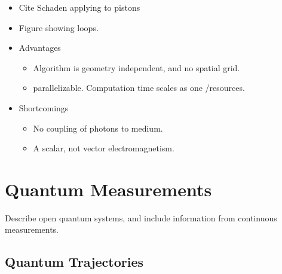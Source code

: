 \begin{itemize}
\begin{itemize}
  \begin{equation}
    F = - \int \frac{dT}{T^{1+D/2}} \dlangle e^{-\cT\langle V\rangle} - 1\drangle,
  \end{equation}
  where $\cT$ is the loop proper time, $\langle V\rangle$ is the average of the potential around a particular loop, and $\dlangle\cdots\drangle$ denotes an ensemble average over Brownian paths.  
\item Typically take $V = \lambda\delta[\vect{x}-\sigma(\vect{x})]$, where $\sigma(\vect{x})=0$ is a function describing the surfaces.  In the limit $\lambda\rightarrow\infty$ this amounts to enforcing Dirichlet boundary conditions on the fields at the surfaces.  
\end{itemize}
\item Cite Schaden applying to pistons\cite{Schaden2009}
\item Figure showing loops.  
\item Advantages
  \begin{itemize}
  \item Algorithm is geometry independent, and no spatial grid.
  \item parallelizable.  Computation time scales as one /resources.  
  \end{itemize}

\item Shortcomings
\begin{itemize}
  \item No coupling of photons to medium.
  \item A scalar, not vector electromagnetism.
\end{itemize}
  
\end{itemize}

\section{Quantum Measurements}

Describe open quantum systems, and include information from continuous measurements. 

\subsection{Quantum Trajectories}

